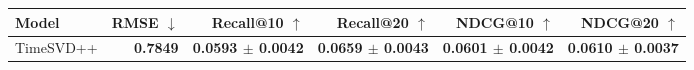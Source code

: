 \begin{tabular}{lrrrrr}
\toprule
Model & RMSE $\downarrow$ & Recall@10 $\uparrow$ & Recall@20 $\uparrow$ & NDCG@10 $\uparrow$ & NDCG@20 $\uparrow$ \\
\midrule
TimeSVD++ & \textbf{0.7849} & \textbf{0.0593 $\pm$ 0.0042} & \textbf{0.0659 $\pm$ 0.0043} & \textbf{0.0601 $\pm$ 0.0042} & \textbf{0.0610 $\pm$ 0.0037} \\
\bottomrule
\end{tabular}
